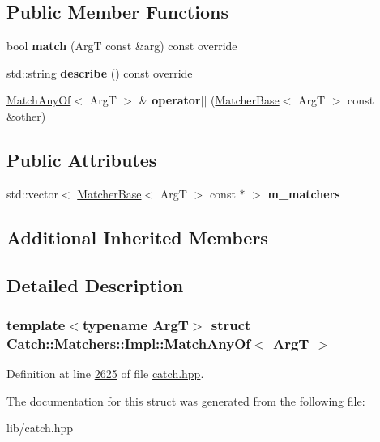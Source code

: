 \subsection*{Public Member Functions}
\begin{DoxyCompactItemize}
\item 
\mbox{\label{structCatch_1_1Matchers_1_1Impl_1_1MatchAnyOf_a8a3e8338f979e56277dcf553efb78dc0}} 
bool {\bfseries match} (ArgT const \&arg) const override
\item 
\mbox{\label{structCatch_1_1Matchers_1_1Impl_1_1MatchAnyOf_a315285204df93d1f8e72f50dd66eb709}} 
std\+::string {\bfseries describe} () const override
\item 
\mbox{\label{structCatch_1_1Matchers_1_1Impl_1_1MatchAnyOf_a44d7582dbe09fc31b9a5ba8a6367b506}} 
\mbox{\hyperlink{structCatch_1_1Matchers_1_1Impl_1_1MatchAnyOf}{Match\+Any\+Of}}$<$ ArgT $>$ \& {\bfseries operator$\vert$$\vert$} (\mbox{\hyperlink{structCatch_1_1Matchers_1_1Impl_1_1MatcherBase}{Matcher\+Base}}$<$ ArgT $>$ const \&other)
\end{DoxyCompactItemize}
\subsection*{Public Attributes}
\begin{DoxyCompactItemize}
\item 
\mbox{\label{structCatch_1_1Matchers_1_1Impl_1_1MatchAnyOf_a1fb1119e6110dc15b8d5262ec0aeddd5}} 
std\+::vector$<$ \mbox{\hyperlink{structCatch_1_1Matchers_1_1Impl_1_1MatcherBase}{Matcher\+Base}}$<$ ArgT $>$ const  $\ast$ $>$ {\bfseries m\+\_\+matchers}
\end{DoxyCompactItemize}
\subsection*{Additional Inherited Members}


\subsection{Detailed Description}
\subsubsection*{template$<$typename ArgT$>$\newline
struct Catch\+::\+Matchers\+::\+Impl\+::\+Match\+Any\+Of$<$ Arg\+T $>$}



Definition at line \mbox{\hyperlink{catch_8hpp_source_l02625}{2625}} of file \mbox{\hyperlink{catch_8hpp_source}{catch.\+hpp}}.



The documentation for this struct was generated from the following file\+:\begin{DoxyCompactItemize}
\item 
lib/catch.\+hpp\end{DoxyCompactItemize}
